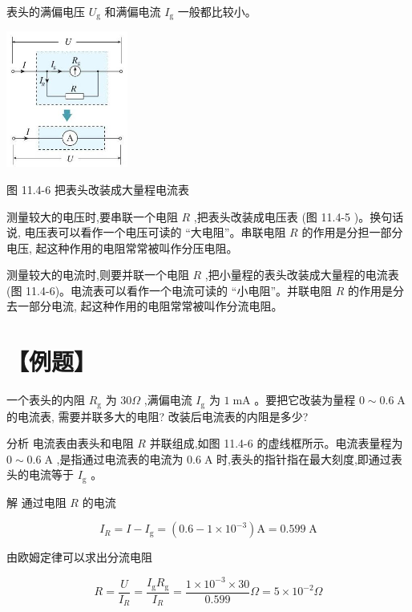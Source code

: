 \documentclass[10pt]{article}
\begin{document}
表头的满偏电压 \({U}_{\mathrm{g}}\) 和满偏电流 \({I}_{\mathrm{g}}\) 一般都比较小。

\begin{center}
\includegraphics[max width=0.3\textwidth]{images/01911d5f-8e38-70c0-b5b8-2b399bd115b6_75_674862.jpg}
\end{center}

图 11.4-6 把表头改装成大量程电流表

测量较大的电压时,要串联一个电阻 \(R\) ,把表头改装成电压表 (图 11.4-5 )。换句话说, 电压表可以看作一个电压可读的 “大电阻”。串联电阻 \(R\) 的作用是分担一部分电压, 起这种作用的电阻常常被叫作分压电阻。

测量较大的电流时,则要并联一个电阻 \(R\) ,把小量程的表头改装成大量程的电流表 (图 11.4-6)。电流表可以看作一个电流可读的 “小电阻”。并联电阻 \(R\) 的作用是分去一部分电流, 起这种作用的电阻常常被叫作分流电阻。

\section*{【例题】}

一个表头的内阻 \({R}_{\mathrm{g}}\) 为 \({30\Omega }\) ,满偏电流 \({I}_{\mathrm{g}}\) 为 \(1\mathrm{\;{mA}}\) 。要把它改装为量程 \(0 \sim {0.6}\mathrm{\;A}\) 的电流表, 需要并联多大的电阻? 改装后电流表的内阻是多少?

分析 电流表由表头和电阻 \(R\) 并联组成,如图 11.4-6 的虚线框所示。电流表量程为 \(0 \sim {0.6}\mathrm{\;A}\) ,是指通过电流表的电流为 \({0.6}\mathrm{\;A}\) 时,表头的指针指在最大刻度,即通过表头的电流等于 \({I}_{\mathrm{g}}\) 。

解 通过电阻 \(R\) 的电流

\[
{I}_{R} = I - {I}_{\mathrm{g}} = \left( {{0.6} - 1 \times {10}^{-3}}\right) \mathrm{A} = {0.599}\mathrm{\;A}
\]

由欧姆定律可以求出分流电阻

\[
R = \frac{U}{{I}_{R}} = \frac{{I}_{\mathrm{g}}{R}_{\mathrm{g}}}{{I}_{R}} = \frac{1 \times {10}^{-3} \times {30}}{0.599}\Omega = 5 \times {10}^{-2}\Omega
\]
\end{document}
